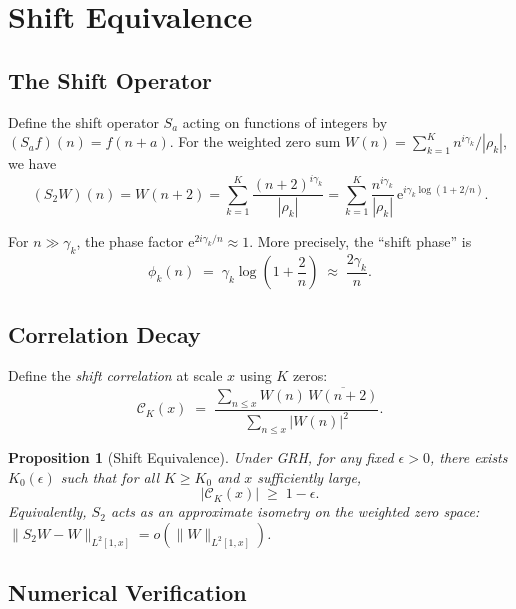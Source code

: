 \documentclass[11pt,a4paper]{article}
\newtheorem{proposition}[theorem]{Proposition}
\theoremstyle{remark}
\newcommand{\euler}{\mathrm{e}}
\begin{document}
\section{Shift Equivalence}\label{sec:shift}

\subsection{The Shift Operator}

Define the shift operator $S_a$ acting on functions of integers by $(S_a f)(n)=f(n+a)$.
For the weighted zero sum $W(n)=\sum_{k=1}^K n^{i\gamma_k}/|\rho_k|$, we have
\begin{equation}\label{eq:shift_action}
(S_2 W)(n) = W(n+2) = \sum_{k=1}^K\frac{(n+2)^{i\gamma_k}}{|\rho_k|}
= \sum_{k=1}^K\frac{n^{i\gamma_k}}{|\rho_k|}\,\euler^{i\gamma_k\log(1+2/n)}.
\end{equation}

For $n\gg\gamma_k$, the phase factor $\euler^{2i\gamma_k/n}\approx 1$.
More precisely, the ``shift phase'' is
\begin{equation}\label{eq:shift_phase}
\phi_k(n) \;=\; \gamma_k\log\!\left(1+\frac{2}{n}\right) \;\approx\; \frac{2\gamma_k}{n}.
\end{equation}

\subsection{Correlation Decay}

Define the \emph{shift correlation} at scale $x$ using $K$ zeros:
\begin{equation}\label{eq:corr_def}
\mathcal{C}_K(x) \;=\; \frac{\sum_{n\le x}W(n)\,\overline{W(n+2)}}{\sum_{n\le x}|W(n)|^2}.
\end{equation}

\begin{proposition}[Shift Equivalence]\label{prop:shift}
Under GRH, for any fixed $\epsilon>0$, there exists $K_0(\epsilon)$ such that for all $K\ge K_0$ and $x$ sufficiently large,
\[
|\mathcal{C}_K(x)| \;\ge\; 1-\epsilon.
\]
Equivalently, $S_2$ acts as an approximate isometry on the weighted zero space:
$\|S_2 W - W\|_{L^2[1,x]} = o(\|W\|_{L^2[1,x]})$.
\end{proposition}

\subsection{Numerical Verification}
\end{document}
